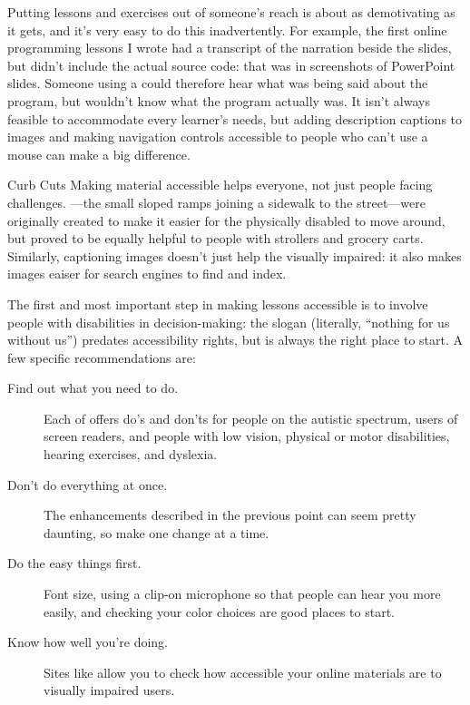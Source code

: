 
Putting lessons and exercises out of someone's reach is about as demotivating as it gets,
and it's very easy to do this inadvertently.
For example,
the first online programming lessons I wrote had a transcript of the narration
beside the slides,
but didn't include the actual source code:
that was in screenshots of PowerPoint slides.
Someone using a 
could therefore hear what was being said about the program,
but wouldn't know what the program actually was.
It isn't always feasible to accommodate every learner's needs,
but adding description captions to images
and making navigation controls accessible to people who can't use a mouse
can make a big difference.

\begin{aside}{Curb Cuts}
  Making material accessible helps everyone,
  not just people facing challenges.
  ---the small sloped ramps joining a sidewalk to the street---were
  originally created to make it easier for the physically disabled to move around,
  but proved to be equally helpful to people with strollers and grocery carts.
  Similarly,
  captioning images doesn't just help the visually impaired:
  it also makes images eaiser for search engines to find and index.
\end{aside}

The first and most important step in making lessons accessible is
to involve people with disabilities in decision-making:
the slogan \emph{}
(literally, ``nothing for us without us'')
predates accessibility rights,
but is always the right place to start.
A few specific recommendations are:

\begin{description}

\item[Find out what you need to do.]
  Each of 
  offers do's and don'ts for people on the autistic spectrum,
  users of screen readers,
  and people with low vision,
  physical or motor disabilities,
  hearing exercises,
  and dyslexia.

\item[Don't do everything at once.]
  The enhancements described in the previous point can seem pretty daunting,
  so make one change at a time.

\item[Do the easy things first.]
  Font size,
  using a clip-on microphone so that people can hear you more easily,
  and checking your color choices are good places to start.

\item[Know how well you're doing.]
  Sites like  allow you to check
  how accessible your online materials are to visually impaired users.

\end{description}

